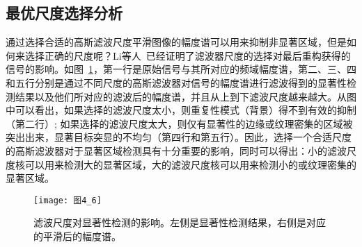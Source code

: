 \subsection{最优尺度选择分析}
\label{4_1_3}

通过选择合适的高斯滤波尺度平滑图像的幅度谱可以用来抑制非显著区域，但是如何来选择正确的尺度呢？Li等人~\cite{LiJianTPAMI2013Scale}已经证明了滤波器尺度的选择对最后重构获得的信号的影响。如图~\ref{图4_6}，第一行是原始信号与其所对应的频域幅度谱，第二、三、四和五行分别是通过不同尺度的高斯滤波器对信号的幅度谱进行滤波得到的显著性检测结果以及他们所对应的滤波后的幅度谱，并且从上到下滤波尺度越来越大。从图中可以看出，如果选择的滤波尺度太小，则重复性模式（背景）得不到有效的抑制（第二行）; 如果选择的滤波尺度太大，则仅有显著性的边缘或纹理密集的区域被突出出来，显著目标突显的不均匀（第四行和第五行）。因此，选择一个合适尺度的高斯滤波器对于显著区域检测具有十分重要的影响，同时可以得出：小的滤波尺度核可以用来检测大的显著区域，大的滤波尺度核可以用来检测小的或纹理密集的显著区域。
\begin{figure}[h]
  \centering
  \texttt{[image: 图4\_6]}
  \caption{滤波尺度对显著性检测的影响。左侧是显著性检测结果，右侧是对应的平滑后的幅度谱。}   
  \label{图4_6} 
\end{figure}

